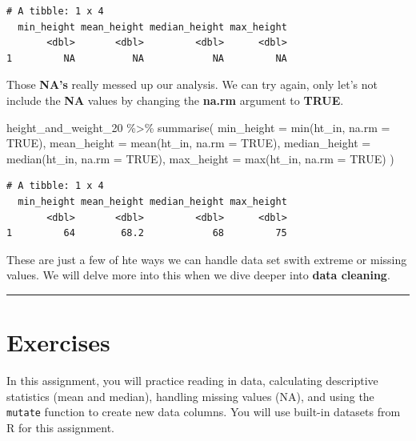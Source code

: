 \documentclass[
  letterpaper,
  DIV=11,
  numbers=noendperiod]{scrreprt}
\newenvironment{Shaded}{\begin{snugshade}}{\end{snugshade}}
\newcommand{\AttributeTok}[1]{\textcolor[rgb]{0.40,0.45,0.13}{#1}}
\newcommand{\ConstantTok}[1]{\textcolor[rgb]{0.56,0.35,0.01}{#1}}
\newcommand{\FunctionTok}[1]{\textcolor[rgb]{0.28,0.35,0.67}{#1}}
\newcommand{\NormalTok}[1]{\textcolor[rgb]{0.00,0.23,0.31}{#1}}
\newcommand{\SpecialCharTok}[1]{\textcolor[rgb]{0.37,0.37,0.37}{#1}}
\begin{document}
\begin{verbatim}
# A tibble: 1 x 4
  min_height mean_height median_height max_height
       <dbl>       <dbl>         <dbl>      <dbl>
1         NA          NA            NA         NA
\end{verbatim}

Those \textbf{NA's} really messed up our analysis. We can try again,
only let's not include the \textbf{NA} values by changing the
\textbf{na.rm} argument to \textbf{TRUE}.

\begin{Shaded}
\begin{Highlighting}[]
\NormalTok{height\_and\_weight\_20 }\SpecialCharTok{\%\textgreater{}\%} 
  \FunctionTok{summarise}\NormalTok{(}
    \AttributeTok{min\_height    =} \FunctionTok{min}\NormalTok{(ht\_in, }\AttributeTok{na.rm =} \ConstantTok{TRUE}\NormalTok{),}
    \AttributeTok{mean\_height   =} \FunctionTok{mean}\NormalTok{(ht\_in, }\AttributeTok{na.rm =} \ConstantTok{TRUE}\NormalTok{),}
    \AttributeTok{median\_height =} \FunctionTok{median}\NormalTok{(ht\_in, }\AttributeTok{na.rm =} \ConstantTok{TRUE}\NormalTok{),}
    \AttributeTok{max\_height    =} \FunctionTok{max}\NormalTok{(ht\_in, }\AttributeTok{na.rm =} \ConstantTok{TRUE}\NormalTok{)}
\NormalTok{  )}
\end{Highlighting}
\end{Shaded}

\begin{verbatim}
# A tibble: 1 x 4
  min_height mean_height median_height max_height
       <dbl>       <dbl>         <dbl>      <dbl>
1         64        68.2            68         75
\end{verbatim}

These are just a few of hte ways we can handle data set swith extreme or
missing values. We will delve more into this when we dive deeper into
\textbf{data cleaning}.

\begin{center}\rule{0.5\linewidth}{0.5pt}\end{center}

\section*{Exercises}\label{exercises-9}


In this assignment, you will practice reading in data, calculating
descriptive statistics (mean and median), handling missing values (NA),
and using the \texttt{mutate} function to create new data columns. You
will use built-in datasets from R for this assignment.
\end{document}
